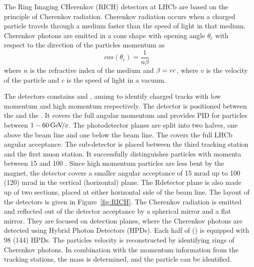 \subsubsection{\rich}

The Ring Imaging CHerenkov (RICH) detectors at LHCb are based on the principle of Cherenkov radiation. 
Cherenkov radiation occurs when a charged particle travels through a medium faster than the speed of light in that medium. 
Cherenkov photons are emitted in a cone shape with opening angle $\theta_{c}$ with respect to the direction of the particles momentum as
\begin{equation}
	cos(\theta_{c}) = \frac{1}{n\beta}
\label{eq:RICH}
\end{equation}
where $n$ is the refractive index of the medium and $\beta=v\/c$, 
where $v$ is the velocity of the particle and $c$ is the speed of light in a vacuum. 

The \rich detectors constains \richone and \richtwo, 
amimg to identify charged tracks with low momentum and high momentum respectively.
The \richone detector is positioned between the \velo and the \ttracker. 
It covers the full angular momentum and provides PID for particles between $1-60\text{\,Ge\kern -0.1em V\!/}c$.
The photodetector planes are split into two halves, 
one above the beam line and one below the beam line. 
The \richtwo covers the full LHCb angular acceptance.
The \richtwo sub-detector is placed between the third tracking station and the first muon station. 
It successfully distinguishes particles with momenta between 15 and 100 \gevc. 
Since high momentum particles are less bent by the magnet, 
the \richtwo detector covers a smaller angular acceptance of 15 mrad up to 100 (120) mrad in the vertical (horizontal) plane. 
The \richtwo Rdetector plane is also made up of two sections, 
placed at either horizontal side of the beam line.
The layout of the \rich detectors is given in Figure~\ref{fig:RICH}. 
The Cherenkov radiation is emitted and reflected out of the detector acceptance by a spherical mirror and a flat mirror. 
They are focused on detection planes, 
where the Cherenkov photons are detected using Hybrid Photon Detectors (HPDs).
Each half of \richone (\richtwo) is equipped with 98 (144) HPDs. 
The particles velocity is reconstructed by identifying rings of Cherenkov photons. 
In combination with the momentum information from the tracking stations, the mass is determined, and the particle can be identified.

